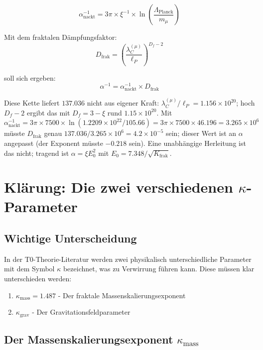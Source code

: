 	\begin{equation}
		\alpha_{\text{nackt}}^{-1} = 3\pi \times \xi^{-1} \times \ln\left(\frac{\Lambda_{\text{Planck}}}{m_\mu}\right)
	\end{equation}
	
	Mit dem fraktalen Dämpfungsfaktor:
	\begin{equation}
		D_{\text{frak}} = \left(\frac{\lambda_C^{(\mu)}}{\ell_P}\right)^{D_f-2}
	\end{equation}
	
	soll sich ergeben:
	\begin{equation}
		\alpha^{-1} = \alpha_{\text{nackt}}^{-1} \times D_{\text{frak}}
	\end{equation}
	
	Diese Kette liefert $137.036$ nicht aus eigener Kraft: $\lambda_C^{(\mu)}/\ell_P = 1.156 \times 10^{20}$; hoch $D_f - 2$ ergibt das mit $D_f = 3 - \xi$ rund $1.15 \times 10^{20}$. Mit $\alpha_{\text{nackt}}^{-1} = 3\pi \times 7500 \times \ln(1.2209 \times 10^{22}/105.66) = 3\pi \times 7500 \times 46.196 = 3.265 \times 10^{6}$ müsste $D_{\text{frak}}$ genau $137.036/3.265 \times 10^{6} = 4.2 \times 10^{-5}$ sein; dieser Wert ist an $\alpha$ angepasst (der Exponent müsste $-0.218$ sein). Eine unabhängige Herleitung ist das nicht; tragend ist $\alpha = \xi E_0^2$ mit $E_0 = 7.348/\sqrt{K_{\text{frak}}}$.
	
	\section{Klärung: Die zwei verschiedenen $\kappa$-Parameter}
	
	\subsection{Wichtige Unterscheidung}
	
	In der T0-Theorie-Literatur werden zwei physikalisch unterschiedliche Parameter mit dem Symbol $\kappa$ bezeichnet, was zu Verwirrung führen kann. Diese müssen klar unterschieden werden:
	
	\begin{enumerate}
		\item $\kappa_{\text{mass}} = 1.487$ - Der fraktale Massenskalierungsexponent
		\item $\kappa_{\text{grav}}$ - Der Gravitationsfeldparameter
	\end{enumerate}
	
	\subsection{Der Massenskalierungsexponent $\kappa_{\text{mass}}$}
	
